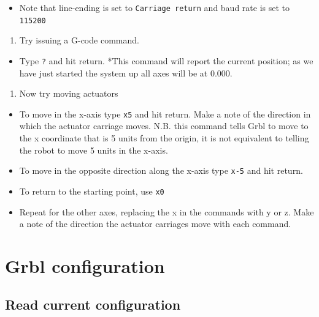 \documentclass[]{book}
\providecommand{\tightlist}{%
  \setlength{\itemsep}{0pt}\setlength{\parskip}{0pt}}
\theoremstyle{definition}
\theoremstyle{definition}
\theoremstyle{remark}
\begin{document}
\begin{itemize}
\tightlist
\item
  Note that line-ending is set to \texttt{Carriage\ return} and baud
  rate is set to \texttt{115200}
\end{itemize}

\begin{enumerate}
\def\labelenumi{\arabic{enumi}.}
\setcounter{enumi}{1}
\tightlist
\item
  Try issuing a G-code command.
\end{enumerate}

\begin{itemize}
\tightlist
\item
  Type \texttt{?} and hit return. *This command will report the current
  position; as we have just started the system up all axes will be at
  0.000.
\end{itemize}

\begin{enumerate}
\def\labelenumi{\arabic{enumi}.}
\setcounter{enumi}{2}
\tightlist
\item
  Now try moving actuators
\end{enumerate}

\begin{itemize}
\tightlist
\item
  To move in the x-axis type \texttt{x5} and hit return. Make a note of
  the direction in which the actuator carriage moves. N.B. this command
  tells Grbl to move to the x coordinate that is 5 units from the
  origin, it is not equivalent to telling the robot to move 5 units in
  the x-axis.
\item
  To move in the opposite direction along the x-axis type \texttt{x-5}
  and hit return.
\item
  To return to the starting point, use \texttt{x0}
\item
  Repeat for the other axes, replacing the x in the commands with y or
  z. Make a note of the direction the actuator carriages move with each
  command.
\end{itemize}

\section{Grbl configuration}\label{grbl-configuration}

\subsection{Read current
configuration}\label{read-current-configuration}
\end{document}
